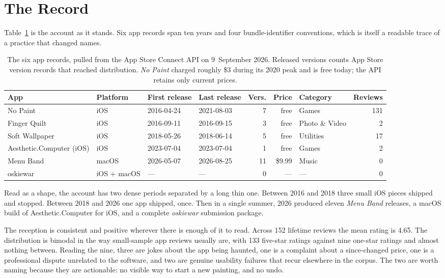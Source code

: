 \documentclass[10pt,letterpaper,twocolumn]{article}
\newcommand{\acdot}{{\color{acpink}.}}
\newcommand{\ac}{Aesthetic{\acdot}Computer}
\begin{document}
\section{The Record}
\label{sec:record}

Table~\ref{tab:records} is the account as it stands. Six app records span
ten years and four bundle-identifier conventions, which is itself a
readable trace of a practice that changed names.

\begin{table}[t]
\centering
\small
\caption{The six app records, pulled from the App Store Connect API on 9~September 2026. Released versions counts App Store version records that reached distribution. \emph{No Paint} charged roughly \$3 during its 2020 peak and is free today; the API retains only current prices.}
\label{tab:records}
\begin{tabularx}{\textwidth}{@{}l l l l r r X r@{}}
\toprule
\textbf{App} & \textbf{Platform} & \textbf{First release} & \textbf{Last release} & \textbf{Vers.} & \textbf{Price} & \textbf{Category} & \textbf{Reviews} \\
\midrule
No Paint            & iOS          & 2016-04-24 & 2021-08-03 & 7  & free   & Games         & 131 \\
Finger Quilt        & iOS          & 2016-09-11 & 2016-09-15 & 3  & free   & Photo \& Video & 2 \\
Soft Wallpaper      & iOS          & 2018-05-26 & 2018-06-14 & 5  & free   & Utilities     & 17 \\
\ac{} (iOS)  & iOS          & 2023-07-04 & 2023-07-04 & 1  & free   & Games         & 2 \\
Menu Band           & macOS        & 2026-05-07 & 2026-08-25 & 11 & \$9.99 & Music         & 0 \\
oskiewar            & iOS + macOS  & ---        & ---        & 0  & ---    & ---           & 0 \\
\bottomrule
\end{tabularx}
\end{table}

Read as a shape, the account has two dense periods separated by a long
thin one. Between 2016 and 2018 three small iOS pieces shipped and
stopped. Between 2018 and 2026 one app shipped, once. Then in a single
summer, 2026 produced eleven \emph{Menu Band} releases, a macOS build of
\ac{} for iOS, and a complete \emph{oskiewar} submission
package.

The reception is consistent and positive wherever there is enough of it
to read. Across 152 lifetime reviews the mean rating is 4.65. The
distribution is bimodal in the way small-sample app reviews usually are,
with 133 five-star ratings against nine one-star ratings and almost
nothing between. Reading the nine, three are jokes about the app being
haunted, one is a complaint about a since-changed price, one is a
professional dispute unrelated to the software, and two are genuine
usability failures that recur elsewhere in the corpus. The two are worth
naming because they are actionable: no visible way to start a new
painting, and no undo.
\end{document}
